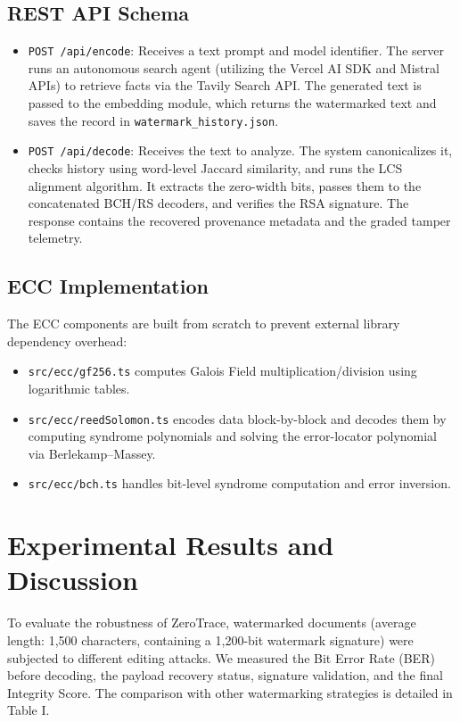 \documentclass[conference]{IEEEtran}
\begin{document}
\subsection{REST API Schema}
\begin{itemize}
    \item \texttt{POST /api/encode}: Receives a text prompt and model identifier. The server runs an autonomous search agent (utilizing the Vercel AI SDK and Mistral APIs) to retrieve facts via the Tavily Search API. The generated text is passed to the embedding module, which returns the watermarked text and saves the record in \texttt{watermark\_history.json}.
    \item \texttt{POST /api/decode}: Receives the text to analyze. The system canonicalizes it, checks history using word-level Jaccard similarity, and runs the LCS alignment algorithm. It extracts the zero-width bits, passes them to the concatenated BCH/RS decoders, and verifies the RSA signature. The response contains the recovered provenance metadata and the graded tamper telemetry.
\end{itemize}

\subsection{ECC Implementation}
The ECC components are built from scratch to prevent external library dependency overhead:
\begin{itemize}
    \item \texttt{src/ecc/gf256.ts} computes Galois Field multiplication/division using logarithmic tables.
    \item \texttt{src/ecc/reedSolomon.ts} encodes data block-by-block and decodes them by computing syndrome polynomials and solving the error-locator polynomial via Berlekamp--Massey.
    \item \texttt{src/ecc/bch.ts} handles bit-level syndrome computation and error inversion.
\end{itemize}

\section{Experimental Results and Discussion}
To evaluate the robustness of ZeroTrace, watermarked documents (average length: 1,500 characters, containing a 1,200-bit watermark signature) were subjected to different editing attacks. We measured the Bit Error Rate (BER) before decoding, the payload recovery status, signature validation, and the final Integrity Score. The comparison with other watermarking strategies is detailed in Table I.
\end{document}
